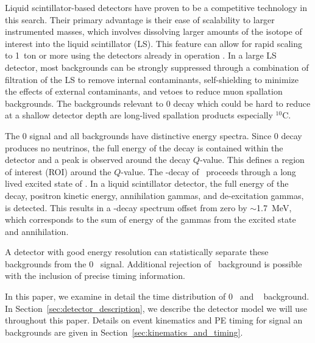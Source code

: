 Liquid scintillator-based detectors have
proven to be a competitive technology in this search\cite{KamLANDZen2013}. Their primary advantage is their ease of scalability to
larger instrumented masses, which involves dissolving larger amounts of
the isotope of interest into the liquid scintillator (LS). This
feature can allow for rapid scaling to 1~ton or more using the
detectors already in operation \cite{Biller2013}. In a large LS
detector, most backgrounds can be strongly suppressed through a
combination of filtration of the LS to remove internal contaminants,
self-shielding to minimize the effects of external contaminants, and
vetoes to reduce muon spallation backgrounds. The backgrounds relevant to
0{\nbb} decay which could be hard to reduce at a shallow detector depth are long-lived spallation products especially $^{10}$C.



The 0{\nbb} signal and all backgrounds have distinctive energy spectra. Since 0{\nbb} decay produces no neutrinos, the full energy of the
decay is contained within the detector and a peak is observed around the decay $Q$-value. This defines a region of interest (ROI) around 
the $Q$-value. The \bpd-decay of \C~proceeds through a 
long lived excited state of \Bten. In a liquid scintillator detector, the full energy of the decay, positron kinetic energy, annihilation 
gammas, and de-excitation gammas, is detected. This results in a \bmd-decay spectrum offset from zero by $\sim$1.7~MeV, which corresponds
to the sum of energy of the gammas from the excited state and annihilation.

A detector with good energy resolution can statistically separate these backgrounds from the 0\nbb~ signal. Additional rejection of 
\C~background is possible with the inclusion of precise timing information.

In this paper, we examine in detail the time distribution of 0\nbb~ and \C~ background.  
In Section~\ref{sec:detector_description}, we describe the detector model we will use throughout this paper. 
Details on event kinematics and PE timing for signal an backgrounds are given in Section~\ref{sec:kinematics_and_timing}.



